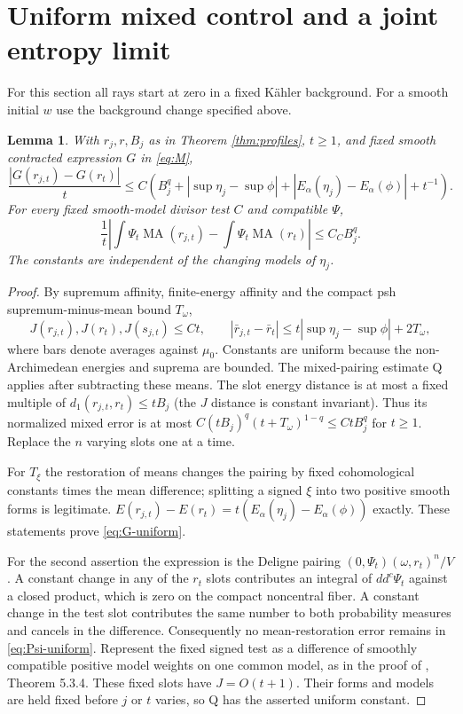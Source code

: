 \documentclass[11pt]{article}
\newcommand{\MA}{\operatorname{MA}}
\newcommand{\ddc}{dd^c}
\newtheorem{lemma}[theorem]{Lemma}
\theoremstyle{remark}\newtheorem{remark}[theorem]{Remark}
\begin{document}
\section{Uniform mixed control and a joint entropy limit}\label{sec:mixed}
For this section all rays start at zero in a fixed K\"ahler background.
For a smooth initial $w$ use the background change specified above.
\begin{lemma}\label{lem:uniform-mixed}
With $r_j,r,B_j$ as in Theorem \ref{thm:profiles}, $t\geq1$, and
fixed smooth contracted expression $G$ in \eqref{eq:M},
\begin{equation}\label{eq:G-uniform}
 \frac{|G(r_{j,t})-G(r_t)|}{t}
 \leq C\left(B_j^q+|\sup\eta_j-\sup\phi|
                    +|E_\alpha(\eta_j)-E_\alpha(\phi)|+t^{-1}\right).
\end{equation}
For every fixed smooth-model divisor test $C$ and compatible $\Psi$,
\begin{equation}\label{eq:Psi-uniform}
 \frac1t\left|\int\Psi_t\MA(r_{j,t})-\int\Psi_t\MA(r_t)\right|
          \leq C_C B_j^q.
\end{equation}
The constants are independent of the changing models of $\eta_j$.
\end{lemma}
\begin{proof}
By supremum affinity, finite-energy affinity and the compact psh
supremum-minus-mean bound $T_\omega$,
\[
 J(r_{j,t}),J(r_t),J(s_{j,t})\leq C t,\qquad
 |\bar r_{j,t}-\bar r_t|
 \leq t|\sup\eta_j-\sup\phi|+2T_\omega,
\]
where bars denote averages against $\mu_0$. Constants are uniform
because the non-Archimedean energies and suprema are bounded.
The mixed-pairing estimate Q applies after subtracting these means.
The slot energy distance is at most a fixed multiple of
$d_1(r_{j,t},r_t)\leq tB_j$ (the $J$ distance is constant invariant).
Thus its normalized mixed error is at most
$C(tB_j)^q(t+T_\omega)^{1-q}\leq CtB_j^q$ for $t\geq1$.
Replace the $n$ varying slots one at a time.

For $T_\xi$ the restoration of means changes the pairing by fixed
cohomological constants times the mean difference; splitting a
signed $\xi$ into two positive smooth forms is legitimate.
$E(r_{j,t})-E(r_t)=t(E_\alpha(\eta_j)-E_\alpha(\phi))$ exactly.
These statements prove \eqref{eq:G-uniform}.

For the second assertion the expression is the Deligne pairing
$(0,\Psi_t)(\omega,r_t)^n/V$. A constant change in any of the
$r_t$ slots contributes an integral of $\ddc\Psi_t$ against a closed
product, which is zero on the compact noncentral fiber. A constant
change in the test slot contributes the same number to both
probability measures and cancels in the difference. Consequently no
mean-restoration error remains in \eqref{eq:Psi-uniform}.
Represent the fixed signed test as a difference of smoothly
compatible positive model weights on one common model, as in the
proof of \cite{MP}, Theorem 5.3.4. These fixed slots have $J=O(t+1)$.
Their forms and models are held fixed before $j$ or $t$ varies, so Q
has the asserted uniform constant.
\end{proof}
\end{document}
